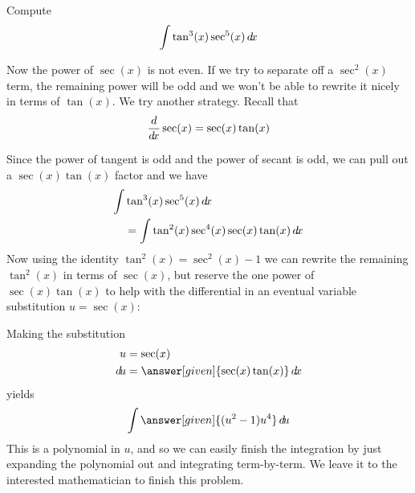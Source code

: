 \documentclass{ximera}
\begin{document}
\begin{example}
  Compute
  \[
  \int \tan^3(x) \sec^5(x) \mathop{}\!d\! x
  \]
  \begin{explanation}
    Now the power of $\sec(x)$ is not even. If we try to separate off a $\sec^{2}(x)$ term, the remaining power 
will be odd and we won't be able to rewrite it nicely in terms of $\tan(x)$.
    We try another strategy. Recall that
\[
\frac{d}{\mathop{}\!d\! x} \sec(x)=\sec(x) \tan(x)
\] 
   
   
    Since the power of tangent is odd and the power of secant is odd,
    we can pull out a $\sec(x)\tan(x)$ factor and we have
    \begin{align*}
    \int &\tan^3(x) \sec^5(x) \mathop{}\!d\! x \\
    &= \int\tan^2(x) \sec^4(x) \sec(x)\tan(x) \mathop{}\!d\! x
    \end{align*}
    Now using the identity $\tan^{2}(x)=\sec^{2}(x)-1$ we can rewrite the remaining $\tan^{2}(x)$ in
    terms of $\sec(x)$, but reserve the one power of $\sec(x)\tan(x)$ to help
    with the differential in an eventual variable substitution $u=\sec(x)$:
    \begin{center}%
    \end{center}
    Making the substitution
    \begin{align*}
      u &= \sec(x)\\
      \d u &=\answer[given]{\sec(x)\tan(x)} \d x
    \end{align*}
    yields
    \[
    \int \answer[given]{(u^2-1)u^4} \d u
    \]
    This is a polynomial in $u$, and so we can easily finish the
    integration by just expanding the polynomial out and integrating
    term-by-term. We leave it to the interested mathematician to
    finish this problem.
  \end{explanation}
\end{example}

%
%
%
%
%
%
%
%
%
%
%
\end{document}
